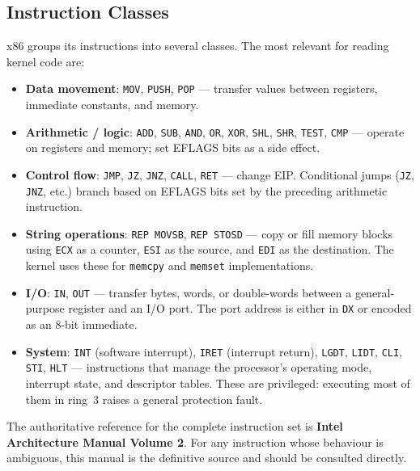 \documentclass[11pt]{article}
\begin{document}
\subsection{Instruction Classes}

x86 groups its instructions into several classes. The most relevant for reading kernel code
are:

\begin{itemize}
    \item \textbf{Data movement}: \texttt{MOV}, \texttt{PUSH}, \texttt{POP} ---
          transfer values between registers, immediate constants, and memory.
    \item \textbf{Arithmetic / logic}: \texttt{ADD}, \texttt{SUB}, \texttt{AND},
          \texttt{OR}, \texttt{XOR}, \texttt{SHL}, \texttt{SHR}, \texttt{TEST},
          \texttt{CMP} --- operate on registers and memory; set EFLAGS bits as a side effect.
    \item \textbf{Control flow}: \texttt{JMP}, \texttt{JZ}, \texttt{JNZ}, \texttt{CALL},
          \texttt{RET} --- change EIP. Conditional jumps (\texttt{JZ}, \texttt{JNZ}, etc.)
          branch based on EFLAGS bits set by the preceding arithmetic instruction.
    \item \textbf{String operations}: \texttt{REP MOVSB}, \texttt{REP STOSD} --- copy or
          fill memory blocks using \texttt{ECX} as a counter, \texttt{ESI} as the source, and
          \texttt{EDI} as the destination. The kernel uses these for \texttt{memcpy} and
          \texttt{memset} implementations.
    \item \textbf{I/O}: \texttt{IN}, \texttt{OUT} --- transfer bytes, words, or double-words
          between a general-purpose register and an I/O port. The port address is either in
          \texttt{DX} or encoded as an 8-bit immediate.
    \item \textbf{System}: \texttt{INT} (software interrupt), \texttt{IRET} (interrupt
          return), \texttt{LGDT}, \texttt{LIDT}, \texttt{CLI}, \texttt{STI},
          \texttt{HLT} --- instructions that manage the processor's operating mode,
          interrupt state, and descriptor tables. These are privileged: executing most of them
          in ring~3 raises a general protection fault.
\end{itemize}

The authoritative reference for the complete instruction set is
\textbf{Intel Architecture Manual Volume 2}. For any instruction whose behaviour is
ambiguous, this manual is the definitive source and should be consulted directly.
\end{document}
